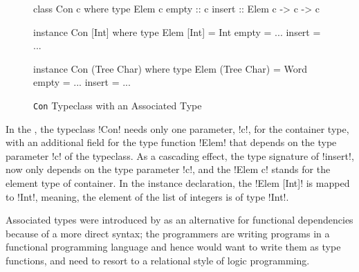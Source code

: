 \documentclass[screen,nonacm,manuscript,review]{acmart} %
\begin{document}
\begin{figure}[ht]
\begin{center}
\begin{minipage}[ht]{0.3\linewidth}
\begin{CenteredBox}
\begin{code}
class Con c where
  type Elem c
  empty :: c
  insert :: Elem c -> c -> c
\end{code}
\end{CenteredBox}
\end{minipage}%
\begin{minipage}[ht]{0.3\linewidth}
\begin{CenteredBox}
\begin{code}
instance Con [Int] where
  type Elem [Int] = Int
  empty = ...
  insert = ...
\end{code}
\end{CenteredBox}
\end{minipage}%
\begin{minipage}[ht]{0.3\linewidth}
\begin{CenteredBox}
\begin{code}
instance Con (Tree Char) where
  type Elem (Tree Char) = Word
  empty = ...
  insert = ...
\end{code}
\end{CenteredBox}
\end{minipage}
\end{center}
\caption[Con typeclass]{\lstinline{Con} Typeclass with an Associated Type}
\label{fig:assoc-types}
\end{figure}

In the , the typeclass !Con! needs only one
parameter, !c!, for the container type, with an additional field for
the type function !Elem! that depends on the type parameter !c! of the
typeclass. As a cascading effect, the type signature of !insert!, now only depends on
the type parameter !c!, and the !Elem c! stands for the element
type of container. In the instance declaration, the !Elem [Int]! is mapped to
!Int!, meaning, the element of the list of integers is of type !Int!.

Associated types were introduced by
\citet{chakravarty_associated_2005}
as an alternative for functional dependencies because of a more
direct syntax; the programmers are writing programs in a functional
programming language and hence would want to write them as type
functions, and need to resort to a relational style of logic programming.
\end{document}
